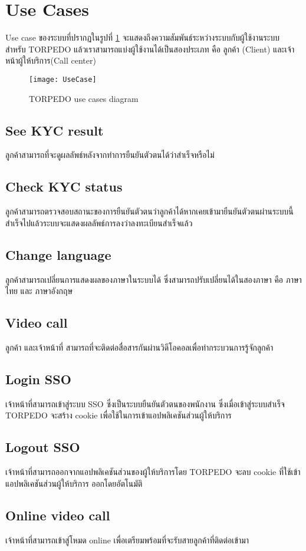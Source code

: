  \section{Use Cases}
 Use case  ของระบบที่ปรากฏในรูปที่ \ref{Fig:usecase} จะแสดงถึงความสัมพันธ์ระหว่างระบบกับผู้ใช้งานระบบ สำหรับ TORPEDO แล้วเราสามารถแบ่งผู้ใช้งานได้เป็นสองประเภท คือ ลูกค้า (Client) และเจ้าหน้าผู้ให้บริการ(Call center)
\begin{figure}[h]
	\centering
	\texttt{[image: UseCase]}
	\caption{TORPEDO use cases diagram}
	\label{Fig:usecase}
\end{figure}

\subsection{See KYC result}
	ลูกค้าสามารถที่จะดูผลลัพธ์หลังจากทำการยืนยันตัวตนได้ว่าสำเร็จหรือไม่
\subsection{Check KYC status}
	ลูกค้าสามารถตรวจสอบสถานะของการยืนยันตัวตนว่าลูกค้าได้หากเคยเข้ามายืนยันตัวตนผ่านระบบนี้สำเร็จไปแล้วระบบจะแสดงผลลัพธ์การลงว่าลงทะเบียนสำเร็จแล้ว
\subsection{Change language}
	ลูกค้าสามารถเปลี่ยนการแสดงผลของภาษาในระบบได้ ซึ่งสามารถปรับเปลี่ยนได้ในสองภาษา คือ ภาษาไทย และ ภาษาอังกฤษ
\subsection{Video call}
	ลูกค้า และเจ้าหน้าที่ สามารถที่จะติดต่อสื่อสารกันผ่านวิดีโอคอลเพื่อทำกระบวนการรู้จักลูกค้า 
\subsection{Login SSO}
	เจ้าหน้าที่สามารถเข้าสู่ระบบ SSO ซึ่งเป็นระบบยืนยันตัวตนของพนักงาน ซึ่งเมื่อเข้าสู๋ระบบสำเร็จ TORPEDO จะสร้าง cookie เพื่อใช้ในการเข้าแอปพลิเคชันส่วนผู้ให้บริการ
\subsection{Logout SSO}
เจ้าหน้าที่สามารถออกจากแอปพลิเคชันส่วนของผู้ให้บริการโดย TORPEDO จะลบ cookie ที่ใช้เข้าแอปพลิเคชันส่วนผู้ให้บริการ ออกโดยอัตโนมัติ
\subsection{Online video call}
เจ้าหน้าที่สามารถเข้าสู่โหมด online เพื่อเตรียมพร้อมที่จะรับสายลูกค้าที่ติดต่อเข้ามา
